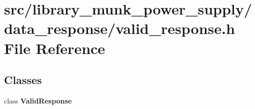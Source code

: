 \section{src/library\+\_\+munk\+\_\+power\+\_\+supply/data\+\_\+response/valid\+\_\+response.h File Reference}
\label{valid__response_8h}
\subsection*{Classes}
\begin{DoxyCompactItemize}
\item 
class \textbf{ Valid\+Response}
\end{DoxyCompactItemize}
